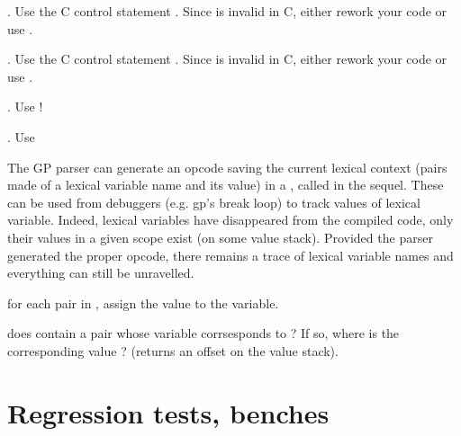 




. Use the C control statement . Since
 is invalid in C, either rework your code or use .

. Use the C control statement . Since
 is invalid in C, either rework your code or use .

. Use !

. Use 


The GP parser can generate an opcode saving the current lexical context
(pairs made of a lexical variable name and its value) in a , called
 in the sequel. These can be used from debuggers (e.g. gp's break
loop) to track values of lexical variable. Indeed, lexical variables have
disappeared from the compiled code, only their values in a given scope exist
(on some value stack). Provided the parser generated the proper opcode, there
remains a trace of lexical variable names and everything can still be
unravelled.

 for each pair in , assign
the value to the variable.

 does  contain
a pair whose variable corrsesponds to  ? If so, where is the
corresponding value ? (returns an offset on the value stack).








\chapter{Regression tests, benches}

